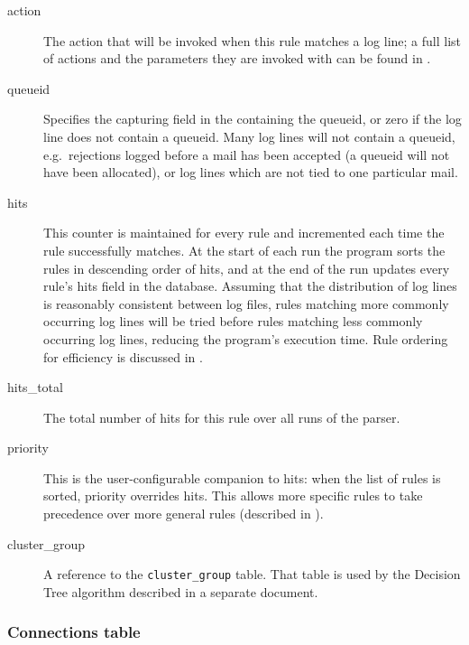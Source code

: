 \begin{description}
    \item [action] The action that will be invoked when this rule matches a
        log line; a full list of actions and the parameters they are
        invoked with can be found in .

    \item [queueid] Specifies the capturing field in the \regex{}
        containing the queueid, or zero if the log line does not contain a
        queueid.  Many log lines will not contain a queueid, e.g.\
        rejections logged before a mail has been accepted (a queueid will
        not have been allocated), or log lines which are not tied to one
        particular mail.

    \item [hits] This counter is maintained for every rule and incremented
        each time the rule successfully matches.  At the start of each run
        the program sorts the rules in descending order of hits, and at the
        end of the run updates every rule's hits field in the database.
        Assuming that the distribution of log lines is reasonably
        consistent between log files, rules matching more commonly
        occurring log lines will be tried before rules matching less
        commonly occurring log lines, reducing the program's execution
        time.  Rule ordering for efficiency is discussed in
        .

    \item [hits\_total] The total number of hits for this rule over all
        runs of the parser.

    \item [priority] This is the user-configurable companion to hits: when
        the list of rules is sorted, priority overrides hits.  This allows
        more specific rules to take precedence over more general rules
        (described in \sectionref{overlapping rules}).

    \item [cluster\_group] A reference to the \texttt{cluster\_group}
        table.  That table is used by the Decision Tree algorithm described
        in a separate document.

\end{description}


\subsubsection{Connections table}

